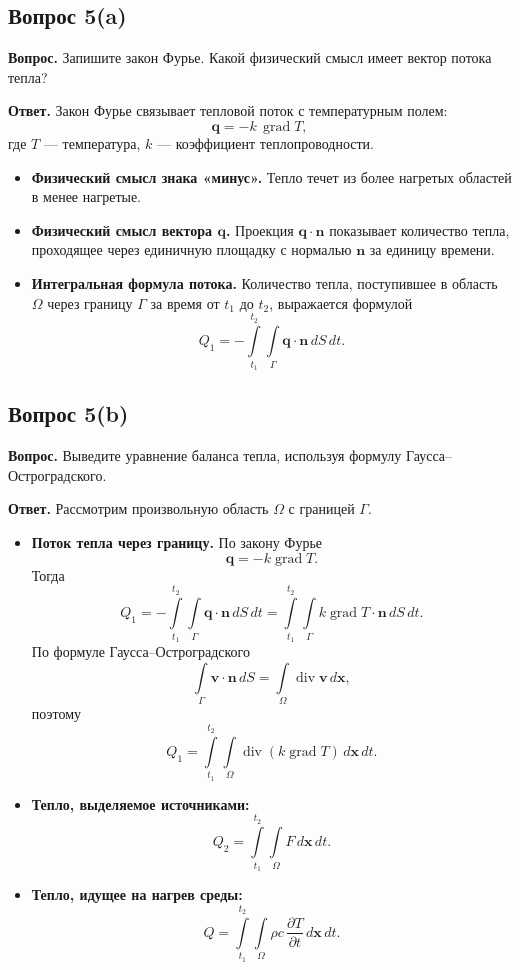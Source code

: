 \documentclass[a4paper,12pt]{article}
\newcommand{\grad}{\operatorname{grad}}
\newcommand{\diver}{\operatorname{div}}
\newcommand{\Question}[2]{\subsection*{Вопрос #1}\textbf{Вопрос.} #2}
\newcommand{\Answer}{\textbf{Ответ.}}
\begin{document}
\Question{5(a)}{Запишите закон Фурье. Какой физический смысл имеет вектор потока тепла?}

\Answer
Закон Фурье связывает тепловой поток с температурным полем:
\[
\mathbf{q}=-k\,\grad T,
\]
где $T$ --- температура, $k$ --- коэффициент теплопроводности.

\begin{itemize}
  \item \textbf{Физический смысл знака «минус».} Тепло течет из более нагретых областей в менее нагретые.
  \item \textbf{Физический смысл вектора $\mathbf{q}$.} Проекция $\mathbf{q}\cdot \mathbf{n}$ показывает количество тепла, проходящее через единичную площадку с нормалью $\mathbf{n}$ за единицу времени.
  \item \textbf{Интегральная формула потока.} Количество тепла, поступившее в область $\Omega$ через границу $\Gamma$ за время от $t_1$ до $t_2$, выражается формулой
  \[
  Q_1=-\int\limits_{t_1}^{t_2}\!\!\int\limits_{\Gamma}\mathbf{q}\cdot\mathbf{n}\,dS\,dt.
  \]
\end{itemize}

\Question{5(b)}{Выведите уравнение баланса тепла,
используя формулу Гаусса--Остроградского.}

\Answer
Рассмотрим произвольную область $\Omega$ с границей $\Gamma$.

\begin{itemize}
  \item \textbf{Поток тепла через границу.} По закону Фурье
  \[
  \mathbf{q}=-k\grad T.
  \]
  Тогда
  \[
  Q_1=-\int\limits_{t_1}^{t_2}\!\!\int\limits_{\Gamma}\mathbf{q}\cdot\mathbf{n}\,dS\,dt
  =\int\limits_{t_1}^{t_2}\!\!\int\limits_{\Gamma}k\grad T\cdot\mathbf{n}\,dS\,dt.
  \]
  По формуле Гаусса--Остроградского
  \[
  \int\limits_{\Gamma}\mathbf{v}\cdot\mathbf{n}\,dS=
  \int\limits_{\Omega}\diver\mathbf{v}\,d\mathbf{x},
  \]
  поэтому
  \[
  Q_1=\int\limits_{t_1}^{t_2}\!\!\int\limits_{\Omega}\diver(k\grad T)\,d\mathbf{x}\,dt.
  \]

  \item \textbf{Тепло, выделяемое источниками:}
  \[
  Q_2=\int\limits_{t_1}^{t_2}\!\!\int\limits_{\Omega}F\,d\mathbf{x}\,dt.
  \]

  \item \textbf{Тепло, идущее на нагрев среды:}
  \[
  Q=\int\limits_{t_1}^{t_2}\!\!\int\limits_{\Omega}
  \rho c\,\frac{\partial T}{\partial t}\,d\mathbf{x}\,dt.
  \]
\end{itemize}
\end{document}
